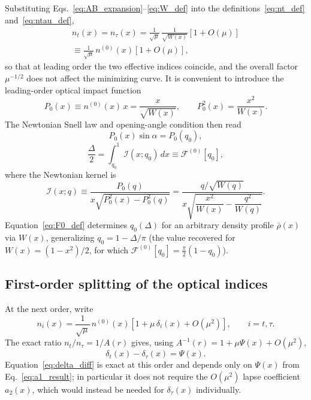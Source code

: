 \documentclass[
  aps,
  prd,
  twocolumn,
  nofootinbib,
  superscriptaddress,
  longbibliography
]{revtex4-2}
\begin{document}
Substituting Eqs.~\eqref{eq:AB_expansion}--\eqref{eq:W_def} into the
definitions~\eqref{eq:nt_def} and~\eqref{eq:ntau_def},
\begin{multline}
n_t(x)=n_\tau(x)
=
\frac{1}{\sqrt{\mu}}\,\frac{1}{\sqrt{W(x)}}
\left[1+O(\mu)\right]
\\
\equiv
\frac{1}{\sqrt{\mu}}\,n^{(0)}(x)\left[1+O(\mu)\right],
\label{eq:n0_def}
\end{multline}
so that at leading order the two effective indices coincide, and the
overall factor $\mu^{-1/2}$ does not affect the minimizing curve. It is
convenient to introduce the leading-order optical impact function
\begin{equation}
P_0(x)\equiv n^{(0)}(x)\,x=\frac{x}{\sqrt{W(x)}},
\qquad
P_0^2(x)=\frac{x^2}{W(x)}.
\label{eq:P0_def}
\end{equation}
The Newtonian Snell law and opening-angle condition then read
\begin{equation}
P_0(x)\sin\alpha=P_0(q_0),
\label{eq:snell0}
\end{equation}
\begin{equation}
\frac{\Delta}{2}
=
\int_{q_0}^1
\mathcal{I}(x;q_0)\,dx
\equiv
\mathcal{F}^{(0)}[q_0],
\label{eq:F0_def}
\end{equation}
where the Newtonian kernel is
\begin{equation}
\mathcal{I}(x;q)
\equiv
\frac{P_0(q)}
{x\sqrt{P_0^2(x)-P_0^2(q)}}
=
\frac{q/\sqrt{W(q)}}
{x\sqrt{\dfrac{x^2}{W(x)}-\dfrac{q^2}{W(q)}}}.
\label{eq:kernel_def}
\end{equation}
Equation~\eqref{eq:F0_def} determines $q_0(\Delta)$ for an arbitrary
density profile $\bar\rho(x)$ via $W(x)$, generalizing
$q_0=1-\Delta/\pi$ (the value recovered for $W(x)=(1-x^2)/2$, for which
$\mathcal{F}^{(0)}[q_0]=\tfrac{\pi}{2}(1-q_0)$).

\subsection{First-order splitting of the optical indices}

At the next order, write
\begin{equation}
n_i(x)
=
\frac{1}{\sqrt{\mu}}\,n^{(0)}(x)
\left[1+\mu\,\delta_i(x)+O(\mu^2)\right],
\qquad i=t,\tau.
\label{eq:ni_expansion}
\end{equation}
The exact ratio $n_t/n_\tau=1/A(r)$ gives, using
$A^{-1}(r)=1+\mu\Psi(x)+O(\mu^2)$,
\begin{equation}
\delta_t(x)-\delta_\tau(x)=\Psi(x).
\label{eq:delta_diff}
\end{equation}
Equation~\eqref{eq:delta_diff} is exact at this order and depends only
on $\Psi(x)$ from Eq.~\eqref{eq:a1_result}; in particular it does not
require the $O(\mu^2)$ lapse coefficient $a_2(x)$, which would instead
be needed for $\delta_\tau(x)$ individually.
\end{document}
